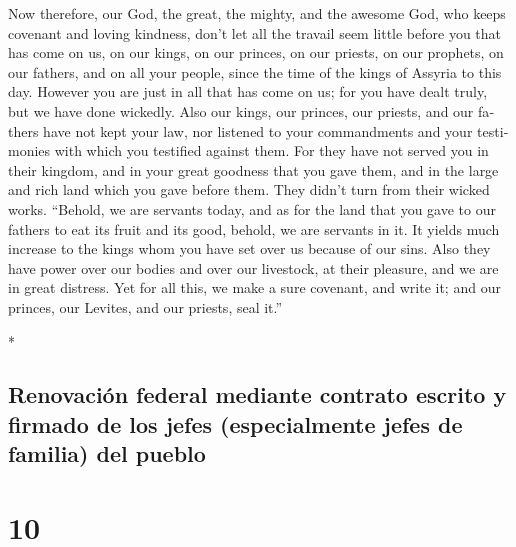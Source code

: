 \begin{paracol}{2}
\begin{otherlanguage}{english}
 Now therefore, our God, the great, the mighty, and the
awesome God, who keeps covenant and loving kindness, don't let all the
travail seem little before you that has come on us, on our kings, on our
princes, on our priests, on our prophets, on our fathers, and on all
your people, since the time of the kings of Assyria to this day.
 However you are just in all that has come on us; for you
have dealt truly, but we have done wickedly.  Also our
kings, our princes, our priests, and our fathers have not kept your law,
nor listened to your commandments and your testimonies with which you
testified against them.  For they have not served you in
their kingdom, and in your great goodness that you gave them, and in the
large and rich land which you gave before them. They didn't turn from
their wicked works.  ``Behold, we are servants today, and
as for the land that you gave to our fathers to eat its fruit and its
good, behold, we are servants in it.  It yields much
increase to the kings whom you have set over us because of our sins.
Also they have power over our bodies and over our livestock, at their
pleasure, and we are in great distress.  Yet for all
this, we make a sure covenant, and write it; and our princes, our
Levites, and our priests, seal it.''

\end{otherlanguage}

\switchcolumn[0]*

\hypertarget{renovaciuxf3n-federal-mediante-contrato-escrito-y-firmado-de-los-jefes-especialmente-jefes-de-familia-del-pueblo}{%
\subsection{Renovación federal mediante contrato escrito y firmado de
los jefes (especialmente jefes de familia) del
pueblo}\label{renovaciuxf3n-federal-mediante-contrato-escrito-y-firmado-de-los-jefes-especialmente-jefes-de-familia-del-pueblo}}

\hypertarget{section-18}{%
\section{10}\label{section-18}}


\end{paracol}
